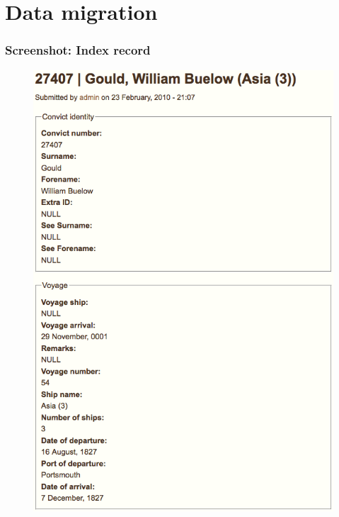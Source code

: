 \documentclass[ignorenonframetext,11pt]{beamer}
\begin{document}
\section{Data migration}
\label{datamigration}

\begin{frame}
\frametitle{Screenshot: Index record}
\label{screenshot:indexrecord}

\begin{figure}
	\label{gould}
	\begin{center}
	\includegraphics[keepaspectratio,width=\textwidth, height=.75\textheight]{images/27407.png}
	\end{center}
	\end{figure}
	



\end{frame}
		
\end{document}
